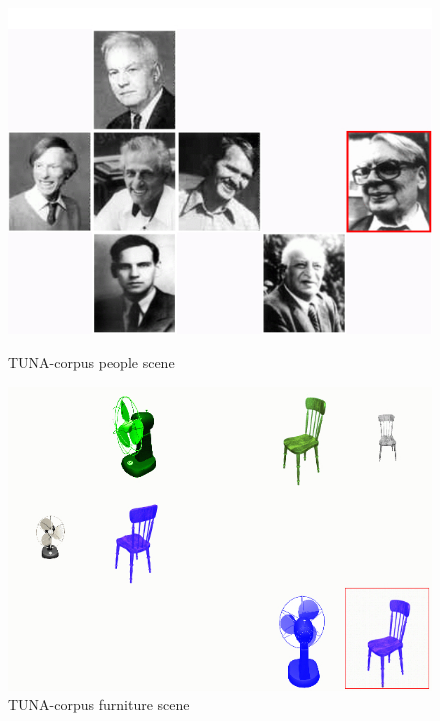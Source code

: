 \begin{figure}[ht]
\begin{minipage}{0.50\linewidth}
\centering
\includegraphics[width=\textwidth]{images/tuna-people.jpg}

\caption{TUNA-corpus people scene}
\label{Tuna-people-scene}
\end{minipage}
\begin{minipage}{0.50\linewidth}
\centering
\vspace*{.2cm}
\includegraphics[width=\textwidth]{images/tuna.jpg}

\caption{TUNA-corpus furniture scene}
\label{Tuna-furniture-scene}
\end{minipage}
\end{figure}

